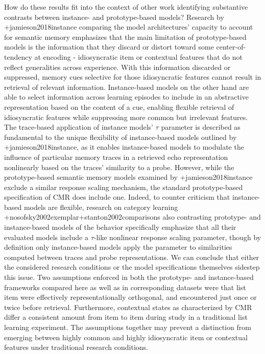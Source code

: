 {}How do these results fit into the context of other work identifying substantive contrasts between instance- and prototype-based models? Research by +{}{}{jamieson2018instance} comparing the model architectures' capacity to account for semantic memory emphasizes that the main limitation of prototype-based models is the information that they discard or distort toward some center-of-tendency at encoding - idiosyncratic item or contextual features that do not reflect generalities across experience. With this information discarded or suppressed, memory cues selective for those idiosyncratic features cannot result in retrieval of relevant information. Instance-based models on the other hand are able to select information across learning episodes to include in an abstractive representation based on the content of a cue, enabling flexible retrieval of idiosyncratic features while suppressing more common but irrelevant features.\markdownRendererInterblockSeparator
{}The trace-based application of instance models' $\tau$ parameter is described as fundamental to the unique flexibility of instance-based models outlined by +{}{}{jamieson2018instance}, as it enables instance-based models to modulate the influence of particular memory traces in a retrieved echo representation nonlinearly based on the traces' similarity to a probe. However, while the prototype-based semantic memory models examined by +{}{}{jamieson2018instance} exclude a similar response scaling mechanism, the standard prototype-based specification of CMR does include one. Indeed, to counter criticism that instance-based models are  flexible, research on category learning +{}{}{nosofsky2002exemplar}+{}{}{stanton2002comparisons} also contrasting prototype- and instance-based models of the behavior specifically emphasize that all their evaluated models include a $\tau$-like nonlinear response scaling parameter, though by definition only instance-based models apply the parameter to similarities computed between traces and probe representations.\markdownRendererInterblockSeparator
{}We can conclude that either the considered research conditions or the model specifications themselves sidestep this issue. Two assumptions enforced in both the prototype- and instance-based frameworks compared here as well as in corresponding datasets were that list item were effectively representationally orthogonal, and encountered just once or twice before retrieval. Furthermore, contextual states as characterized by CMR differ a consistent amount from item to item during study in a traditional list learning experiment. The assumptions together may prevent a distinction from emerging between highly common and highly idiosyncratic item or contextual features under traditional research conditions.\markdownRendererInterblockSeparator
